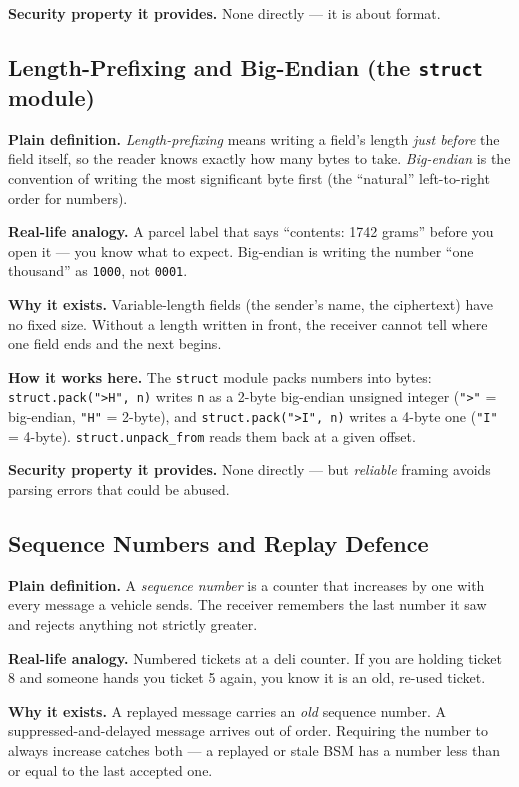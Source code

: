 \documentclass[11pt,a4paper]{article}
\begin{document}
\textbf{Security property it provides.} None directly --- it is about format.

\subsection{Length-Prefixing and Big-Endian (the \texttt{struct} module)}
\textbf{Plain definition.} \emph{Length-prefixing} means writing a field's length
\emph{just before} the field itself, so the reader knows exactly how many bytes
to take. \emph{Big-endian} is the convention of writing the most significant byte
first (the ``natural'' left-to-right order for numbers).

\textbf{Real-life analogy.} A parcel label that says ``contents: 1742 grams''
before you open it --- you know what to expect. Big-endian is writing the number
``one thousand'' as \texttt{1000}, not \texttt{0001}.

\textbf{Why it exists.} Variable-length fields (the sender's name, the
ciphertext) have no fixed size. Without a length written in front, the receiver
cannot tell where one field ends and the next begins.

\textbf{How it works here.} The \texttt{struct} module packs numbers into bytes:
\texttt{struct.pack(">H", n)} writes \texttt{n} as a 2-byte big-endian unsigned
integer (\texttt{">"} = big-endian, \texttt{"H"} = 2-byte), and
\texttt{struct.pack(">I", n)} writes a 4-byte one (\texttt{"I"} = 4-byte).
\texttt{struct.unpack\_from} reads them back at a given offset.

\textbf{Security property it provides.} None directly --- but \emph{reliable}
framing avoids parsing errors that could be abused.

\subsection{Sequence Numbers and Replay Defence}
\textbf{Plain definition.} A \emph{sequence number} is a counter that increases
by one with every message a vehicle sends. The receiver remembers the last
number it saw and rejects anything not strictly greater.

\textbf{Real-life analogy.} Numbered tickets at a deli counter. If you are
holding ticket 8 and someone hands you ticket 5 again, you know it is an old,
re-used ticket.

\textbf{Why it exists.} A replayed message carries an \emph{old} sequence number.
A suppressed-and-delayed message arrives out of order. Requiring the number to
always increase catches both --- a replayed or stale BSM has a number less than
or equal to the last accepted one.
\end{document}
